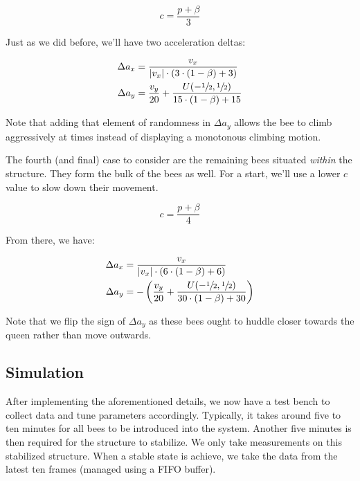 \documentclass[a4paper,10pt]{article}
\begin{document}
\begin{multicols}{2}
    \begin{equation}
        c = \frac{p + \beta}{3}
    \end{equation}

    Just as we did before, we'll have two acceleration deltas:

    \begin{equation}
        \begin{split}
            \Delta a_{x} &= \frac{v_{x}}{|v_{x}| \cdot (3 \cdot  (1-\beta) + 3)} \\
            \Delta a_{y} &= \frac{v_{y}}{20} + \frac{U(-\sfrac{1}{2}, \sfrac{1}{2})}{15 \cdot (1-\beta) + 15}
        \end{split}
    \end{equation}

    Note that adding that element of randomness in $\Delta a_{y}$ allows the bee
    to climb aggressively at times instead of displaying a monotonous climbing motion.

    The fourth (and final) case to consider are the remaining bees situated \textit{within}
    the structure. They form the bulk of the bees as well. For a start, we'll use a lower
    $c$ value to slow down their movement.

    \begin{equation}
        c = \frac{p + \beta}{4}
    \end{equation}

    From there, we have:

    \begin{equation}
        \begin{split}
            \Delta a_{x} &= \frac{v_{x}}{|v_{x}| \cdot (6 \cdot  (1-\beta) + 6)} \\
            \Delta a_{y} &= -\left(\frac{v_{y}}{20} + \frac{U(-\sfrac{1}{2}, \sfrac{1}{2})}{30 \cdot (1-\beta) + 30}\right)
        \end{split}
    \end{equation}

    Note that we flip the sign of $\Delta a_{y}$ as these bees ought to huddle closer towards
    the queen rather than move outwards.

    \subsection{Simulation}

    After implementing the aforementioned details, we now have a test bench to collect
    data and tune parameters accordingly. Typically, it takes around five to ten minutes
    for all bees to be introduced into the system. Another five minutes is then required
    for the structure to stabilize. We only take measurements on this stabilized structure.
    When a stable state is achieve, we take the data from the latest ten frames (managed using a FIFO buffer).


\end{multicols}
\end{document}
